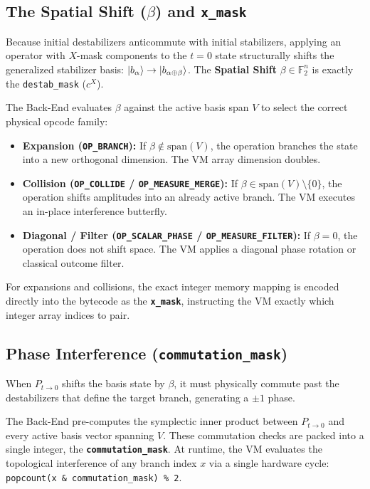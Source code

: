 \documentclass[11pt]{article}
\begin{document}
\subsection{The Spatial Shift ($\beta$) and \texttt{x\_mask}}
Because initial destabilizers anticommute with initial stabilizers, applying an operator with $X$-mask components to the $t=0$ state structurally shifts the generalized stabilizer basis: $\ket{b_\alpha} \to \ket{b_{\alpha \oplus \beta}}$. The \textbf{Spatial Shift} $\beta \in \mathbb{F}_2^n$ is exactly the \texttt{destab\_mask} ($c^X$).

The Back-End evaluates $\beta$ against the active basis span $V$ to select the correct physical opcode family:
\begin{itemize}
    \item \textbf{Expansion (\texttt{OP\_BRANCH}):} If $\beta \notin \text{span}(V)$, the operation branches the state into a new orthogonal dimension. The VM array dimension doubles.
    \item \textbf{Collision (\texttt{OP\_COLLIDE} / \texttt{OP\_MEASURE\_MERGE}):} If $\beta \in \text{span}(V) \setminus \{0\}$, the operation shifts amplitudes into an already active branch. The VM executes an in-place interference butterfly.
    \item \textbf{Diagonal / Filter (\texttt{OP\_SCALAR\_PHASE} / \texttt{OP\_MEASURE\_FILTER}):} If $\beta = 0$, the operation does not shift space. The VM applies a diagonal phase rotation or classical outcome filter.
\end{itemize}
For expansions and collisions, the exact integer memory mapping is encoded directly into the bytecode as the \textbf{\texttt{x\_mask}}, instructing the VM exactly which integer array indices to pair.

\subsection{Phase Interference (\texttt{commutation\_mask})}
When $P_{t \to 0}$ shifts the basis state by $\beta$, it must physically commute past the destabilizers that define the target branch, generating a $\pm 1$ phase.

The Back-End pre-computes the symplectic inner product between $P_{t \to 0}$ and every active basis vector spanning $V$. These commutation checks are packed into a single integer, the \textbf{\texttt{commutation\_mask}}. At runtime, the VM evaluates the topological interference of any branch index $x$ via a single hardware cycle: \texttt{popcount(x \& commutation\_mask) \% 2}.
\end{document}
